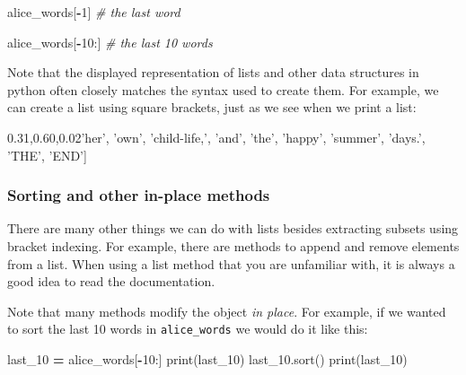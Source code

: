 \documentclass[]{book}
\newenvironment{Shaded}{\begin{snugshade}}{\end{snugshade}}
\newcommand{\DecValTok}[1]{\textcolor[rgb]{0.00,0.00,0.81}{#1}}
\newcommand{\StringTok}[1]{\textcolor[rgb]{0.31,0.60,0.02}{#1}}
\newcommand{\CommentTok}[1]{\textcolor[rgb]{0.56,0.35,0.01}{\textit{#1}}}
\newcommand{\OperatorTok}[1]{\textcolor[rgb]{0.81,0.36,0.00}{\textbf{#1}}}
\newcommand{\BuiltInTok}[1]{#1}
\newcommand{\NormalTok}[1]{#1}
\begin{document}
\begin{Shaded}
\begin{Highlighting}[]
\NormalTok{alice_words[}\OperatorTok{-}\DecValTok{1}\NormalTok{] }\CommentTok{# the last word}
\end{Highlighting}
\end{Shaded}

\begin{Shaded}
\begin{Highlighting}[]
\NormalTok{alice_words[}\OperatorTok{-}\DecValTok{10}\NormalTok{:] }\CommentTok{# the last 10 words}
\end{Highlighting}
\end{Shaded}

Note that the displayed representation of lists and other data
structures in python often closely matches the syntax used to create
them. For example, we can create a list using square brackets, just as
we see when we print a list:

\begin{Shaded}
\begin{Highlighting}[]
\NormalTok{[}\StringTok{'her'}\NormalTok{,}
 \StringTok{'own'}\NormalTok{,}
 \StringTok{'child-life,'}\NormalTok{,}
 \StringTok{'and'}\NormalTok{,}
 \StringTok{'the'}\NormalTok{,}
 \StringTok{'happy'}\NormalTok{,}
 \StringTok{'summer'}\NormalTok{,}
 \StringTok{'days.'}\NormalTok{,}
 \StringTok{'THE'}\NormalTok{,}
 \StringTok{'END'}\NormalTok{]}
\end{Highlighting}
\end{Shaded}

\subsubsection{Sorting and other in-place
methods}\label{sorting-and-other-in-place-methods}

There are many other things we can do with lists besides extracting
subsets using bracket indexing. For example, there are methods to append
and remove elements from a list. When using a list method that you are
unfamiliar with, it is always a good idea to read the documentation.

Note that many methods modify the object \emph{in place}. For example,
if we wanted to sort the last 10 words in \texttt{alice\_words} we would
do it like this:

\begin{Shaded}
\begin{Highlighting}[]
\NormalTok{last_10 }\OperatorTok{=}\NormalTok{ alice_words[}\OperatorTok{-}\DecValTok{10}\NormalTok{:]}
\BuiltInTok{print}\NormalTok{(last_10)}
\NormalTok{last_10.sort()}
\BuiltInTok{print}\NormalTok{(last_10)}
\end{Highlighting}
\end{Shaded}
\end{document}
